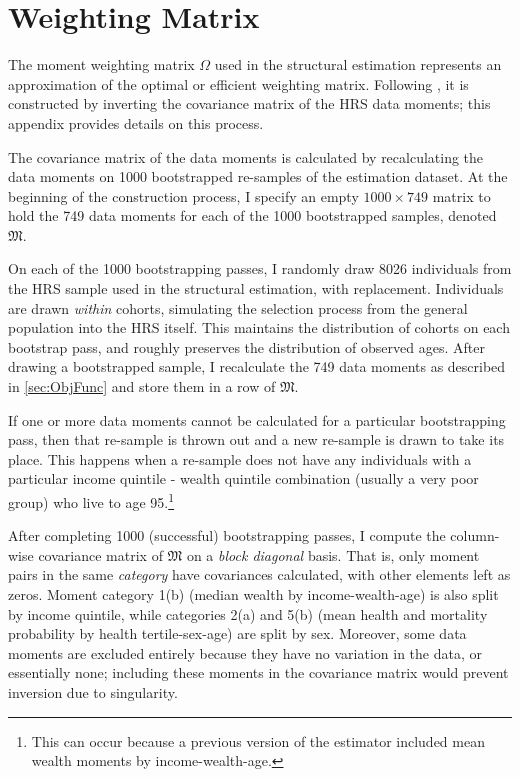\documentclass[12pt,pdftex,letterpaper]{article}
\begin{document}
\section{Weighting Matrix}
\label{app:Weighting}

The moment weighting matrix $\Omega$ used in the structural estimation represents an approximation of the optimal or efficient weighting matrix.  Following \cite{gourieroux93}, it is constructed by inverting the covariance matrix of the HRS data moments; this appendix provides details on this process.

The covariance matrix of the data moments is calculated by recalculating the data moments on 1000 bootstrapped re-samples of the estimation dataset.  At the beginning of the construction process, I specify an empty $1000 \times 749$ matrix to hold the 749 data moments for each of the 1000 bootstrapped samples, denoted $\mathfrak{M}$.

On each of the 1000 bootstrapping passes, I randomly draw 8026 individuals from the HRS sample used in the structural estimation, with replacement.  Individuals are drawn \textit{within} cohorts, simulating the selection process from the general population into the HRS itself. This maintains the distribution of cohorts on each bootstrap pass, and roughly preserves the distribution of observed ages.  After drawing a bootstrapped sample, I recalculate the 749 data moments as described in \ref{sec:ObjFunc} and store them in a row of $\mathfrak{M}$.

If one or more data moments cannot be calculated for a particular bootstrapping pass, then that re-sample is thrown out and a new re-sample is drawn to take its place.  This happens when a re-sample does not have any individuals with a particular income quintile - wealth quintile combination (usually a very poor group) who live to age 95.\footnote{This can occur because a previous version of the estimator included mean wealth moments by income-wealth-age.}

After completing 1000 (successful) bootstrapping passes, I compute the column-wise covariance matrix of $\mathfrak{M}$ on a \textit{block diagonal} basis.  That is, only moment pairs in the same \textit{category} have covariances calculated, with other elements left as zeros.  Moment category 1(b) (median wealth by income-wealth-age) is also split by income quintile, while categories 2(a) and 5(b) (mean health and mortality probability by health tertile-sex-age) are split by sex.  Moreover, some data moments are excluded entirely because they have no variation in the data, or essentially none; including these moments in the covariance matrix would prevent inversion due to singularity.
\end{document}

